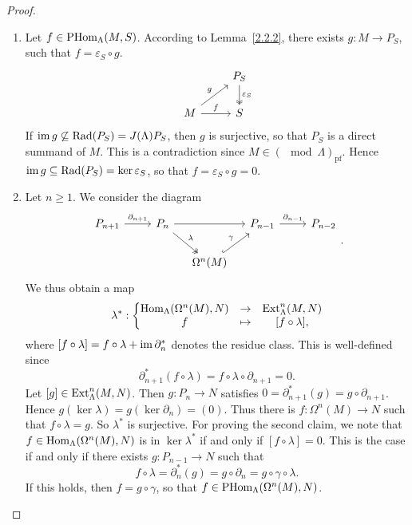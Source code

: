 
\begin{proof}\
\begin{enumerate}
\item Let $f \in \operatorname{PHom}_\Lambda(M,S)$. According to Lemma~\ref{2.2.2}, there exists $g : M \to
  P_S$, such that $f = \varepsilon_S \circ g$.
\[
\begin{tikzcd}
& P_S \ar[d,"\varepsilon_S",two heads] \\
M \ar[r,"f"] \ar[ur,"g"] & S
\end{tikzcd}
\]
If $\operatorname{im} g \not\subseteq \operatorname{Rad}(P_S) =  J(\Lambda)P_S$, then $g$ is surjective, so that $P_S$ is a direct summand of $M$. This is a contradiction since $M \in (\mod{\Lambda})_{\mathrm{pf}}$. Hence $\operatorname{im} g \subseteq \operatorname{Rad}(P_S) = \ker \varepsilon_S$, so that $f = \varepsilon_S
  \circ g = 0$.
%
\item Let $n \ge 1$. We consider the diagram
    \[
    \begin{tikzcd}[column sep=small]
      P_{n+1} \ar[rr, "\partial_{n+1}"]&& P_{n} \ar[rd, twoheadrightarrow, "\lambda"]\ar[rr]&&
      P_{n-1} \ar[rr, "\partial_{n-1}"]&& P_{n-2}\\
      &&& \Omega^n(M) \ar[ru, hook, "\gamma"]
    \end{tikzcd}.
    \]
  We thus obtain a map
    \[
    \lambda^*: \left\{ \begin{matrix}
      \operatorname{Hom}_\Lambda(\Omega^n(M), N) &\to &\operatorname{Ext}_\Lambda^n(M,N)\\
      f                   &\mapsto & [f \circ \lambda],
    \end{matrix}\right.
    \]
  where $[f \circ \lambda] = f \circ \lambda + \operatorname{im} \partial_n^*$ denotes the residue class.
  This is well-defined since
  \[
    \partial_{n+1}^*(f \circ \lambda) = f \circ \lambda \circ \partial_{n+1} = 0.
  \]
  Let $[g] \in \operatorname{Ext}_\Lambda^n(M,N)$. Then $g: P_n \to N$ satisfies $0 =
  \partial_{n+1}^*(g) = g \circ \partial_{n+1}$. Hence $g(\ker \lambda) = g(\ker
  \partial_n) = (0)$. Thus there is $f: \Omega^n(M) \to N$ such that $f \circ \lambda = g$.
  So $\lambda^*$ is surjective. For proving the second claim, we note that $f \in \operatorname{Hom}_\Lambda(\Omega^n(M),N)$ is in $\ker \lambda^*$ if and only if $[f \circ \lambda] = 0$. This is the case if and only if there exists $g : P_{n-1} \to N$ such that
  \[
  f \circ \lambda =
  \partial_n^*(g) = g \circ \partial_n = g \circ \gamma \circ \lambda.
  \]
If this holds, then $f = g \circ \gamma$, so that $f \in \operatorname{PHom}_\Lambda(\Omega^n(M), N)$.

\end{enumerate}
\end{proof}
